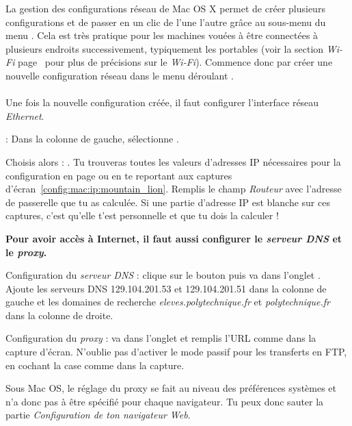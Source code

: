 
La gestion des configurations réseau de Mac OS X permet de créer plusieurs configurations et de passer en un clic de l'une  l'autre grâce au sous-menu  du menu . Cela est très pratique pour les machines vouées à  être connectées à  plusieurs endroits successivement, typiquement les portables (voir la section \emph{Wi-Fi} page~\pageref{wifi} pour plus de précisions sur le \emph{Wi-Fi}). Commence donc par créer une nouvelle configuration réseau dans le menu déroulant .
\\
\\
Une fois la nouvelle configuration créée, il faut configurer l'interface réseau \emph{Ethernet}.


 : Dans la colonne de gauche, sélectionne .

Choisis alors  : . Tu trouveras toutes les valeurs d'adresses IP nécessaires pour la configuration en page \pageref{calcul_ip} ou en te reportant aux captures d'écran~\ref{config:mac:ip:mountain_lion}. Remplis le champ \emph{Routeur} avec l'adresse de passerelle que tu as calculée. Si une partie d'adresse IP est blanche sur ces captures, c'est qu'elle t'est personnelle et que tu dois la calculer !


  
  

\vspace{4mm}

\textbf{Pour avoir accès à  Internet, il faut aussi configurer le \emph{serveur DNS} et le \emph{proxy}.}

Configuration du \emph{serveur DNS} : clique sur le bouton  puis va dans l'onglet . Ajoute les serveurs DNS 129.104.201.53 et 129.104.201.51 dans la colonne de gauche et les domaines de recherche \emph{eleves.polytechnique.fr} et \emph{polytechnique.fr} dans la colonne de droite.



Configuration du \emph{proxy} : va dans l'onglet  et remplis l'URL comme dans la capture d'écran. N'oublie pas d'activer le mode passif pour les transferts en FTP, en cochant la case comme dans la capture.

Sous Mac OS, le réglage du proxy se fait au niveau des préférences systèmes et n'a donc pas à être spécifié pour chaque navigateur. Tu peux donc sauter la partie \emph{Configuration de ton navigateur Web}.




